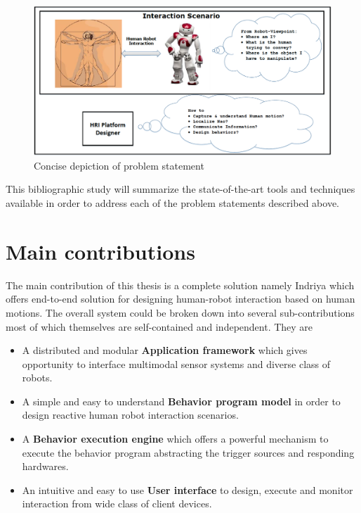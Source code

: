 \begin{figure}[H]
\centering
\includegraphics[width=\textwidth]{assets/ProblemStatement.png}
\caption{Concise depiction of problem statement}
\label{fig:problemstatement}
\end{figure}%

	This bibliographic study will summarize the state-of-the-art tools and techniques available in order to address each of the problem statements described above.

\section{Main contributions}
\label{sec:contributions}

The main contribution of this thesis is a complete solution namely Indriya which offers end-to-end solution for designing human-robot interaction based on human motions. The overall system could be broken down into several sub-contributions most of which themselves are self-contained and independent. They are

\begin{itemize}
\item A distributed and modular \textbf{Application framework} which gives opportunity to interface multimodal sensor systems and diverse class of robots.
\item A simple and easy to understand \textbf{Behavior program model} in order to design reactive human robot interaction scenarios.
\item A \textbf{Behavior execution engine} which offers a powerful mechanism to execute the behavior program abstracting the trigger sources and responding hardwares.
\item An intuitive and easy to use \textbf{User interface} to design, execute and monitor interaction from wide class of client devices.
\end{itemize}

